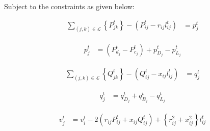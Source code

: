 \documentclass[../../outputs/main.tex]{subfiles}
\begin{document}
Subject to the constraints  as given below:


\begin{align}
    {\sum_{(j, k) \in \mathcal{L}} \left\{P_{jk}^t\right\} 
    - \left(P_{ij}^t - r_{ij}l_{ij}^t\right)} &= p_j^t
    \label{eq:RealPowerBalanceNodej}
\end{align}

\vspace{-2.0em} %

\begin{align}
    p_j^t &= \left(P_{d_j}^t - P_{c_j}^t\right) + p^t_{D_j} - p^t_{L_j} \label{eq:RealPowerBalanceNodej_pj}
\end{align}

\vspace{-2.0em} %


\begin{align}
    {\sum_{(j, k) \in \mathcal{L}} \left\{Q_{jk}^t\right\}  
    - \left(Q_{ij}^t - x_{ij}l_{ij}^t\right)} &= q_j^t
    \label{eq:ReactivePowerBalanceNodej} 
\end{align}

\vspace{-1.5em} %

\begin{align}
    q_j^t &= q_{D_j}^t + q_{B_j}^t - q^t_{L_j} \label{eq:ReactivePowerBalanceNodej_qj}
\end{align}

\vspace{-1.5em} %

\begin{align}
    {v_j^t} &= {v_{i}^t - 2(r_{ij}P_{ij}^t + x_{ij}Q_{ij}^t) + \left\{r_{ij}^2 + x_{ij}^2\right\}l_{ij}^t}  
    \label{eq:KVL-branch-ij}
\end{align}
\end{document}
